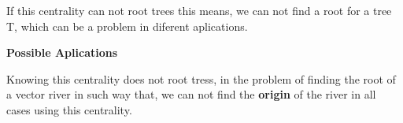 If this centrality can not root trees this means, we can not find a root for a tree T, which can be a problem in diferent aplications.

\vspace{1cm}

\textbf{Possible Aplications}

Knowing this centrality does not root tress, in the problem of finding the root of a vector river in such way that, we can not find the \textbf{origin} of the river in all cases using this centrality.

